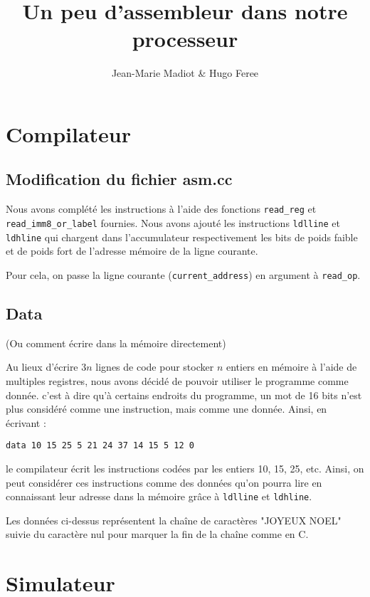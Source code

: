 \documentclass{article}
\author{Jean-Marie Madiot & Hugo Feree}
\title{Un peu d'assembleur dans notre processeur}
\date{}
\begin{document}
 

\maketitle

\section{Compilateur} 

\subsection{Modification du fichier asm.cc} 

Nous avons complété les instructions à l'aide des fonctions {\tt read\_reg} et {\tt read\_imm8\_or\_label} fournies.
Nous avons ajouté les instructions {\tt ldlline} et {\tt ldhline} qui chargent dans l'accumulateur respectivement les bits de poids faible et de poids fort de l'adresse mémoire de la ligne courante.

Pour cela, on passe la ligne courante ({\tt current\_address}) en argument à {\tt read\_op}. 

\subsection{Data}
(Ou comment écrire dans la mémoire directement)

Au lieux d'écrire $3n$ lignes de code pour stocker $n$ entiers en mémoire à l'aide de multiples registres, nous avons décidé de pouvoir utiliser le programme comme donnée. c'est à dire qu'à certains endroits du programme, un mot de 16 bits n'est plus considéré comme une instruction, mais comme une donnée. Ainsi, en écrivant : 
\begin{verbatim}
data 10 15 25 5 21 24 37 14 15 5 12 0
\end{verbatim}
le compilateur écrit les instructions codées par les entiers 10, 15, 25, etc.
Ainsi, on peut considérer ces instructions comme des données qu'on pourra lire en connaissant leur adresse dans la mémoire grâce à {\tt ldlline} et {\tt ldhline}.

Les données ci-dessus représentent la chaîne de caractères "JOYEUX NOEL" suivie du caractère nul pour marquer la fin de la chaîne comme en C.

\section{Simulateur}
\end{document}
